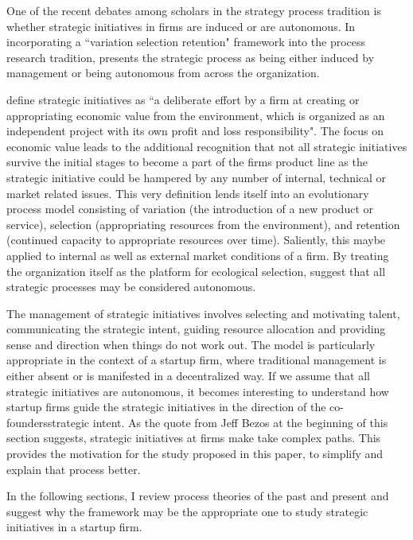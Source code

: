 \documentclass[12pt,letterpaper]{article}
\begin{document}
One of the recent  debates among scholars in the strategy process tradition is  whether strategic initiatives in firms are induced or are autonomous. In incorporating a ``variation selection retention" framework into the process research tradition, \cite{Burgelman1991} presents the strategic process as being either induced by management or being autonomous from across the organization. 

\cite{Lovas2000} define strategic initiatives as ``a deliberate effort by a firm at creating or appropriating economic value from the environment, which is organized as an independent project with its own profit and loss responsibility". The focus on economic value leads to the additional recognition that not all strategic initiatives survive the initial stages to become a part of the firm\textquotesingle s product line as the strategic initiative could be hampered by any number of internal, technical or market related issues. This very definition lends itself into an evolutionary process model consisting of variation (the introduction of a new product or service), selection (appropriating resources from the environment), and retention (continued capacity to appropriate resources over time). Saliently, this maybe applied to internal as well as external market conditions of a firm. By treating the organization itself as the platform for ecological selection, \cite{Lovas2000} suggest that all strategic processes may be considered autonomous. 

The management of strategic initiatives involves selecting and motivating talent, communicating the strategic intent, guiding resource allocation and providing sense and direction when things do not work out. The \cite{Lovas2000} model is particularly appropriate in the context of a startup firm, where traditional management is either absent or is manifested in a decentralized way. If we assume that all strategic initiatives are autonomous, it becomes interesting to understand how startup firms guide the strategic initiatives in the direction of the co-founders\textquotesingle strategic intent. As the quote from Jeff Bezos at the beginning of this section suggests, strategic initiatives at firms make take complex paths. This provides the motivation for the study proposed in this paper, to simplify and explain that process better.

In the following sections, I review process theories of the past and present and suggest why the \cite{Lovas2000} framework may be the appropriate one to study strategic initiatives in a startup firm.
\end{document}
